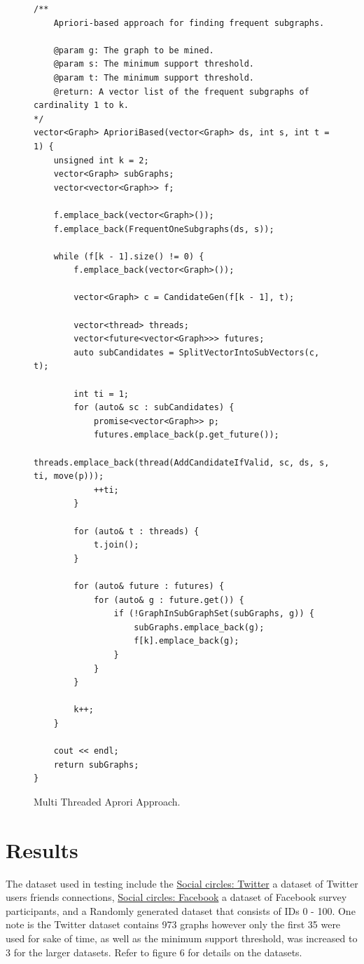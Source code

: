 \documentclass{article}
\begin{document}
\begin{figure}
\begin{lstlisting}
/**
	Apriori-based approach for finding frequent subgraphs.

	@param g: The graph to be mined.
	@param s: The minimum support threshold.
	@param t: The minimum support threshold.
	@return: A vector list of the frequent subgraphs of cardinality 1 to k.
*/
vector<Graph> AprioriBased(vector<Graph> ds, int s, int t = 1) {
	unsigned int k = 2;
	vector<Graph> subGraphs;
	vector<vector<Graph>> f;

	f.emplace_back(vector<Graph>());
	f.emplace_back(FrequentOneSubgraphs(ds, s));

	while (f[k - 1].size() != 0) {
		f.emplace_back(vector<Graph>());

		vector<Graph> c = CandidateGen(f[k - 1], t);

		vector<thread> threads;
		vector<future<vector<Graph>>> futures;
		auto subCandidates = SplitVectorIntoSubVectors(c, t);

		int ti = 1;
		for (auto& sc : subCandidates) {
			promise<vector<Graph>> p;
			futures.emplace_back(p.get_future());
			threads.emplace_back(thread(AddCandidateIfValid, sc, ds, s, ti, move(p)));
			++ti;
		}

		for (auto& t : threads) {
			t.join();
		}

		for (auto& future : futures) {
			for (auto& g : future.get()) {
				if (!GraphInSubGraphSet(subGraphs, g)) {
					subGraphs.emplace_back(g);
					f[k].emplace_back(g);
				}
			}
		}
		
		k++;
	}

	cout << endl;
	return subGraphs;
}
\end{lstlisting}
  \caption{Multi Threaded Aprori Approach.}
  \label{fig:Multi Threaded Aprori Approach}
\end{figure}

\pagebreak

\section{Results}

The dataset used in testing include the \href{http://snap.stanford.edu/data/ego-Twitter.html}{Social circles: Twitter} a dataset of Twitter users friends connections, \href{http://snap.stanford.edu/data/ego-Facebook.html}{Social circles: Facebook} a dataset of Facebook survey participants, and a Randomly generated dataset that consists of IDs 0 - 100. One note is the Twitter dataset contains 973 graphs however only the first 35 were used for sake of time, as well as the minimum support threshold,  was increased to 3 for the larger datasets. Refer to figure 6 for details on the datasets.
\end{document}
